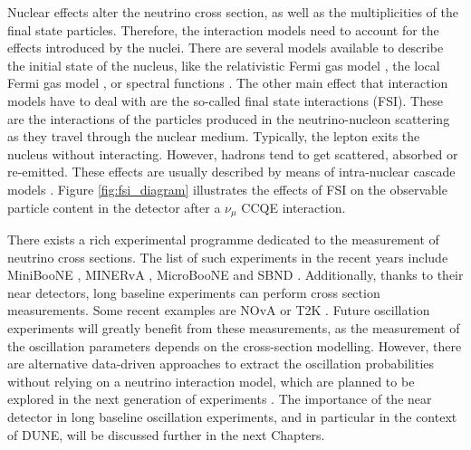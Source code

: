 Nuclear effects alter the neutrino cross section, as well as the multiplicities of the final state particles. Therefore, the interaction models need to account for the effects introduced by the nuclei. There are several models available to describe the initial state of the nucleus, like the relativistic Fermi gas model \cite{Smith1972}, the local Fermi gas model \cite{Chiang1989}, or spectral functions \cite{Nakamura2002}. The other main effect that interaction models have to deal with are the so-called final state interactions (FSI). These are the interactions of the particles produced in the neutrino-nucleon scattering as they travel through the nuclear medium. Typically, the lepton exits the nucleus without interacting. However, hadrons tend to get scattered, absorbed or re-emitted. These effects are usually described by means of intra-nuclear cascade models \cite{Nikolakopoulos2022}. Figure \ref{fig:fsi_diagram} illustrates the effects of FSI on the observable particle content in the detector after a $\nu_{\mu}$ CCQE interaction.

There exists a rich experimental programme dedicated to the measurement of neutrino cross sections. The list of such experiments in the recent years include MiniBooNE \cite{MiniBooNE2010}, MINERvA \cite{MINERvA2016}, MicroBooNE \cite{MicroBooNE2021} and SBND \cite{McConkey2018}. Additionally, thanks to their near detectors, long baseline experiments can perform cross section measurements. Some recent examples are NOvA \cite{Nova2021} or T2K \cite{T2K2019}. Future oscillation experiments will greatly benefit from these measurements, as the measurement of the oscillation parameters depends on the cross-section modelling. However, there are alternative data-driven approaches to extract the oscillation probabilities without relying on a neutrino interaction model, which are planned to be explored in the next generation of experiments \cite{Scott2015,Hasnip2023}. The importance of the near detector in long baseline oscillation experiments, and in particular in the context of DUNE, will be discussed further in the next Chapters.